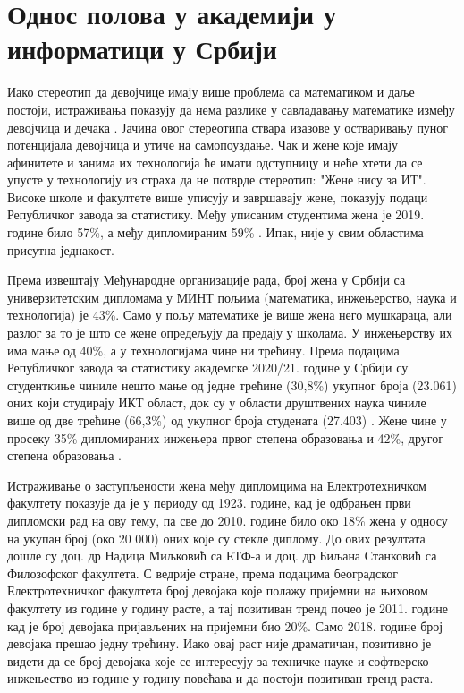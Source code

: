 \documentclass[a4paper]{article}
\begin{document}
\section{Однос полова у академији у информатици у Србији}

Иако стереотип да девојчице имају више проблема са математиком и даље постоји, 
истраживања показују да нема разлике у савладавању математике између девојчица 
и дечака \cite{stereotip}. Јачина овог стереотипа ствара изазове у остваривању 
пуног потенцијала девојчица и утиче на самопоуздање. Чак и жене које имају 
афинитете и занима их технологија ће имати одступницу и неће хтети да се упусте 
у технологију из страха да не потврде стереотип: "Жене нису за ИТ".
Високе школе и факултете више уписују и завршавају жене, показују подаци Републичког 
завода за статистику. Међу уписаним студентима жена је 2019. године било 57\%,
а међу дипломираним 59\% \cite{zene_i_musk_u_Srb}. Ипак, није у свим областима присутна једнакост.

Према извештају Међународне организације рада, број жена у Србији са универзитетским 
дипломама у МИНТ пољима (математика, инжењерство, наука и технологија) је 43\%.
Само у пољу математике је више жена него мушкараца, али разлог за то је што се 
жене опредељују да предају у школама. У инжењерству их има мање од 40\%, а у 
технологијама чине ни трећину. Према подацима Републичког завода за статистику академске 2020/21. 
године у Србији су студенткиње чиниле нешто мање од једне трећине (30,8\%) укупног броја (23.061) 
оних који студирају ИКТ област, док су у области друштвених наука чиниле више од две трећине 
(66,3\%) од укупног броја студената (27.403) \cite{startup_infos}. Жене чине у просеку 35\% 
дипломираних инжењера првог степена образовања и 42\%, другог степена образовања \cite{vlada_ikt}.

Истраживање о заступљености жена међу дипломцима на Електротехничком факултету 
показује да је у периоду од 1923. године, кад је одбрањен први дипломски рад на 
ову тему, па све до 2010. године било око 18\% жена у односу на укупан број 
(око 20 000) оних које су стекле диплому. До ових резултата дошле су доц. др Надица 
Миљковић са ЕТФ-а и доц. др Биљана Станковић са Филозофског факултета. С ведрије стране,
према подацима београдског Електротехничког факултета број девојака које полажу 
пријемни на њиховом факултету из године у годину расте, а тај позитиван тренд почео 
је 2011. године кад је број девојака пријављених на пријемни био 20\%. 
Само 2018. године број девојака прешао једну трећину. Иако овај раст није драматичан, 
позитивно је видети да се број девојака које се интересују за техничке науке и 
софтверско инжењество из године у годину повећава и да постоји позитиван тренд раста.
\end{document}
